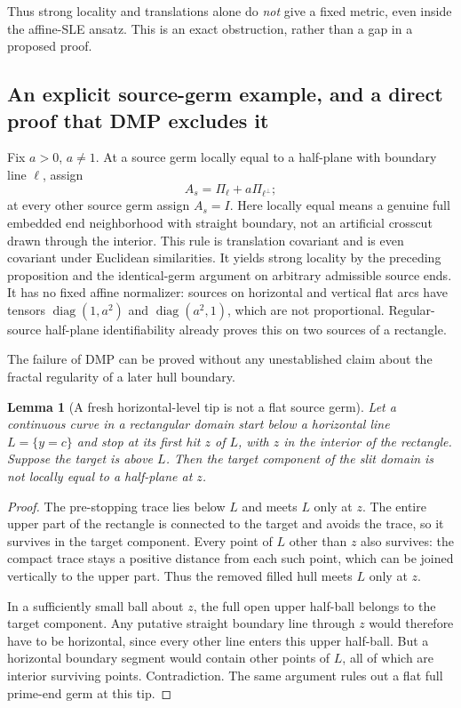 \documentclass[11pt]{article}
\newtheorem{lemma}[theorem]{Lemma}
\theoremstyle{definition}\newtheorem{definition}[theorem]{Definition}
\theoremstyle{remark}\newtheorem{remark}[theorem]{Remark}
\begin{document}
Thus strong locality and translations alone do \emph{not} give a fixed metric,
even inside the affine-SLE ansatz. This is an exact obstruction, rather than
a gap in a proposed proof.

\subsection{An explicit source-germ example, and a direct proof that DMP excludes it}

Fix $a>0$, $a\ne1$. At a source germ locally equal to a half-plane with
boundary line $\ell$, assign
\[
 A_s=\Pi_\ell+a\Pi_{\ell^\perp};
 \tag{AF2}
\]
at every other source germ assign $A_s=I$. Here locally equal means a genuine
full embedded end neighborhood with straight boundary, not an artificial
crosscut drawn through the interior. This rule is translation covariant and
is even covariant under Euclidean similarities. It yields strong locality
by the preceding proposition and the identical-germ argument on arbitrary
admissible source ends.
It has no fixed affine normalizer: sources on horizontal and vertical
flat arcs have tensors $\operatorname{diag}(1,a^2)$ and
$\operatorname{diag}(a^2,1)$, which are not proportional. Regular-source
half-plane identifiability already proves this on two sources of a rectangle.

The failure of DMP can be proved without any unestablished claim about the
fractal regularity of a later hull boundary.

\begin{lemma}[A fresh horizontal-level tip is not a flat source germ]
\label{lem:sl-freshlevel}
Let a continuous curve in a rectangular domain start below a horizontal
line $L=\{y=c\}$ and stop at its first hit $z$ of $L$, with $z$ in the
interior of the rectangle. Suppose the target is above $L$. Then the target
component of the slit domain is not locally equal to a half-plane at $z$.
\end{lemma}
\begin{proof}
The pre-stopping trace lies below $L$ and meets $L$ only at $z$. The entire
upper part of the rectangle is connected to the target and avoids the trace,
so it survives in the target component. Every point of $L$ other than $z$
also survives: the compact trace stays a positive distance from each such
point, which can be joined vertically to the upper part. Thus the removed
filled hull meets $L$ only at $z$.

In a sufficiently small ball about $z$, the full open upper half-ball belongs
to the target component. Any putative straight boundary line through $z$
would therefore have to be horizontal, since every other line enters this
upper half-ball. But a horizontal boundary segment would contain other
points of $L$, all of which are interior surviving points. Contradiction.
The same argument rules out a flat full prime-end germ at this tip.
\end{proof}
\end{document}
